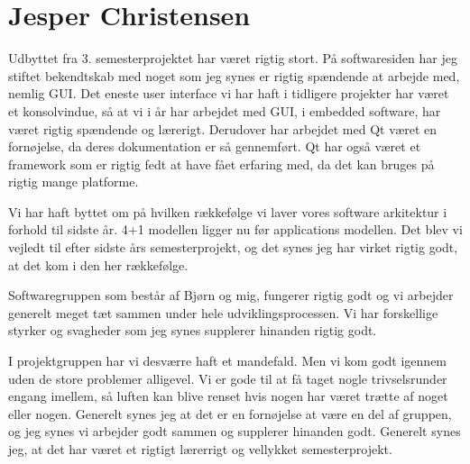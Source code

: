 \section{Jesper Christensen}
Udbyttet fra 3. semesterprojektet har været rigtig stort. På softwaresiden har jeg stiftet bekendtskab med noget som jeg synes er rigtig spændende at arbejde med, nemlig GUI. Det eneste user interface vi har haft i tidligere projekter har været et konsolvindue, så at vi i år har arbejdet med GUI, i embedded software, har været rigtig spændende og lærerigt. Derudover har arbejdet med Qt været en fornøjelse, da deres dokumentation er så gennemført. Qt har også været et framework som er rigtig fedt at have fået erfaring med, da det kan bruges på rigtig mange platforme.

Vi har haft byttet om på hvilken rækkefølge vi laver vores software arkitektur i forhold til sidste år. 4+1 modellen ligger nu før applications modellen. Det blev vi vejledt til efter sidste års semesterprojekt, og det synes jeg har virket rigtig godt, at det kom i den her rækkefølge.

Softwaregruppen som består af Bjørn og mig, fungerer rigtig godt og vi arbejder generelt meget tæt sammen under hele udviklingsprocessen. Vi har forskellige styrker og svagheder som jeg synes supplerer hinanden rigtig godt.

I projektgruppen har vi desværre haft et mandefald. Men vi kom godt igennem uden de store problemer alligevel. Vi er gode til at få taget nogle trivselsrunder engang imellem, så luften kan blive renset hvis nogen har været trætte af noget eller nogen. Generelt synes jeg at det er en fornøjelse at være en del af gruppen, og jeg synes vi arbejder godt sammen og supplerer hinanden godt. Generelt synes jeg, at det har været et rigtigt lærerrigt og vellykket semesterprojekt.
